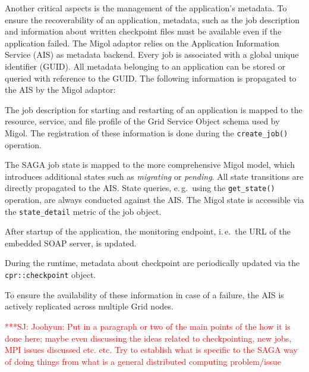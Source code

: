 \documentclass[times, 10pt, twocolumn]{article}
\newcommand{\jhanote}[1]{ {\textcolor{red} { ***SJ: #1 }}}
\newcommand{\jhanote}[1]{}
\begin{document}
Another critical aspects is the management of the application's metadata. To ensure the recoverability 
of an application, metadata, such as the job description and information about written checkpoint files 
must be available even if the application failed. The Migol adaptor relies on the Application 
Information Service (AIS) as metadata backend. Every job is associated with a global unique identifier (GUID).
All metadata belonging to an application can be stored or queried with reference to the GUID. 
The following information is propagated to the AIS by the Migol adaptor:
\begin{compactitem}
    \item The job description for starting and restarting of an application is mapped to the resource, service, and file profile of the Grid Service Object schema used by Migol. The registration of these information is done during the \texttt{create\_job()} operation.
    \item The SAGA job state is mapped to the more comprehensive Migol model, which introduces additional states such as \emph{migrating} or \emph{pending}. All state transitions are directly propagated to the AIS. State queries, e.\,g.\ using the \texttt{get\_state()} operation,  are always conducted against the AIS. The Migol state is accessible via the \texttt{state\_detail} metric of the job object.
    
    \item After startup of the application, the monitoring endpoint, i.\,e.\ the URL of the embedded SOAP server, is updated.
    \item During the runtime, metadata about checkpoint are periodically updated via the \texttt{cpr::checkpoint} object.
\end{compactitem}
To ensure the availability of these information in case of a failure, the AIS is actively replicated across multiple Grid nodes.
                  



                                                  



\jhanote{Joohyun: Put in a paragraph or two of the main points of the
  how it is done here; maybe even discussing the ideas related to
  checkpointing, new jobs, MPI issues discussed etc. etc. Try to
  establish what is specific to the SAGA way of doing things from what
  is a general distributed computing problem/issue}
\end{document}
